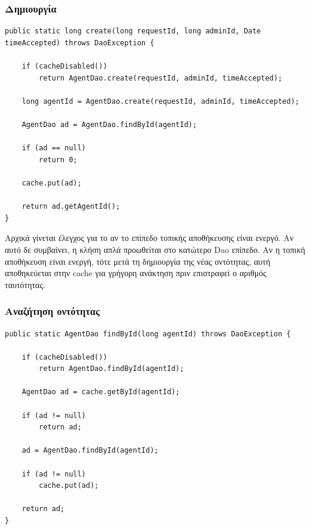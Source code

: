 \documentclass[a4paper,11pt]{article}
\begin{document}
\begin{sloppypar}
\subsubsection{Δημιουργία}

\begin{lstlisting}
public static long create(long requestId, long adminId, Date timeAccepted) throws DaoException {

    if (cacheDisabled())
        return AgentDao.create(requestId, adminId, timeAccepted);
        
    long agentId = AgentDao.create(requestId, adminId, timeAccepted);

    AgentDao ad = AgentDao.findById(agentId);

    if (ad == null)
        return 0;

    cache.put(ad);

    return ad.getAgentId();
}
\end{lstlisting}

Αρχικά γίνεται έλεγχος για το αν το επίπεδο τοπικής αποθήκευσης είναι ενεργό. Αν αυτό δε συμβαίνει, η κλήση απλά προωθείται στο κατώτερο Dao επίπεδο. Αν η τοπική αποθήκευση είναι ενεργή, τότε μετά τη δημιουργία της νέας οντότητας, αυτή αποθηκεύεται στην cache για γρήγορη ανάκτηση πριν επιστραφεί ο αριθμός ταυτότητας.

\newpage


\subsubsection{Αναζήτηση οντότητας}

\begin{lstlisting}
public static AgentDao findById(long agentId) throws DaoException {

    if (cacheDisabled())
        return AgentDao.findById(agentId);

    AgentDao ad = cache.getById(agentId);

    if (ad != null)
        return ad;

    ad = AgentDao.findById(agentId);

    if (ad != null)
        cache.put(ad);
        
    return ad;
}
\end{lstlisting}


\end{sloppypar}
\end{document}
